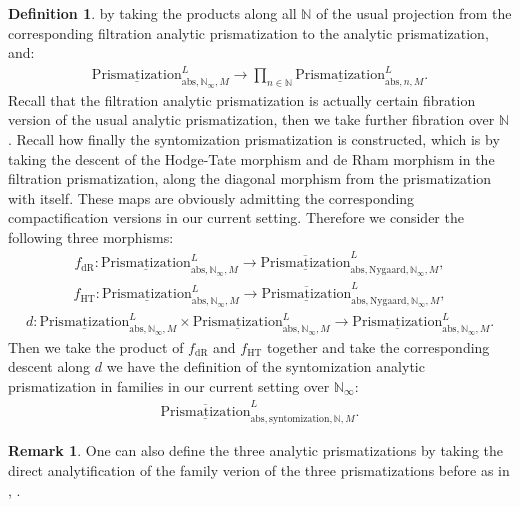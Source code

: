 \documentclass[12pt]{article}
\theoremstyle{definition}
\newtheorem{remark}{Remark}
\newtheorem{definition}{Definition}
\begin{document}
\begin{definition}
by taking the products along all $\mathbb{N}$ of the usual projection from the corresponding filtration analytic prismatization to the analytic  prismatization, and:
\begin{align}
{\underline{\mathrm{Prismatization}}}^L_{\mathrm{abs},\mathbb{N}_\infty,M}\rightarrow  \prod_{n\in \mathbb{N}} {\underline{\mathrm{Prismatization}}}^L_{\mathrm{abs},n,M}.
\end{align}
Recall that the filtration analytic prismatization is actually certain fibration version of the usual analytic prismatization, then we take further fibration over $\mathbb{N}$. Recall how finally the syntomization prismatization is constructed, which is by taking the descent of the Hodge-Tate morphism and de Rham morphism in the filtration prismatization, along the diagonal morphism from the prismatization with itself. These maps are obviously admitting the corresponding compactification versions in our current setting. Therefore we consider the following three morphisms:
\begin{align}
f_\mathrm{dR}: {\underline{\mathrm{Prismatization}}}^L_{\mathrm{abs},\mathbb{N}_\infty,M}\rightarrow \overline{\underline{\mathrm{Prismatization}}}^L_{\mathrm{abs},\mathrm{Nygaard},\mathbb{N}_\infty,M},
\end{align}
\begin{align}
f_\mathrm{HT}: {\underline{\mathrm{Prismatization}}}^L_{\mathrm{abs},\mathbb{N}_\infty,M}\rightarrow \overline{\underline{\mathrm{Prismatization}}}^L_{\mathrm{abs},\mathrm{Nygaard},\mathbb{N}_\infty,M},
\end{align}
\begin{align}
d:  {\underline{\mathrm{Prismatization}}}^L_{\mathrm{abs},\mathbb{N}_\infty,M}\times {\underline{\mathrm{Prismatization}}}^L_{\mathrm{abs},\mathbb{N}_\infty,M} \rightarrow {\underline{\mathrm{Prismatization}}}^L_{\mathrm{abs},\mathbb{N}_\infty,M}.
\end{align}
Then we take the product of $f_\mathrm{dR}$ and $f_\mathrm{HT}$ together and take the corresponding descent along $d$ we have the definition of the syntomization analytic prismatization in families in our current setting over $\mathbb{N}_\infty$:
\begin{align}
\overline{\underline{\mathrm{Prismatization}}}^L_{\mathrm{abs},\mathrm{syntomization},\mathbb{N},M}.
\end{align}
\end{definition}


\begin{remark}
One can also define the three analytic prismatizations by taking the direct analytification of the family verion of the three prismatizations before as in \cite{3S1}, \cite{3ALBRCS}.
\end{remark}
\end{document}

